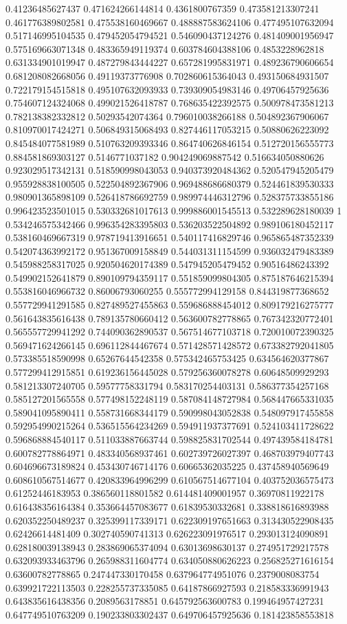 \begin{table}
\begin{tabu}
\begin{sparkline}{10}
0.41236485627437 0.471624266144814 0.4361800767359 0.473581213307241 0.461776389802581 0.475538160469667 0.488887583624106 0.477495107632094 0.517146995104535 0.479452054794521 0.546090437124276 0.481409001956947 0.575169663071348 0.483365949119374 0.603784604388106 0.4853228962818 0.631334901019947 0.487279843444227 0.657281995831971 0.489236790606654 0.681208082668056 0.49119373776908 0.702860615364043 0.493150684931507 0.722179154515818 0.495107632093933 0.739309054983146 0.49706457925636 0.754607124324068 0.499021526418787 0.768635422392575 0.500978473581213 0.782138382332812 0.50293542074364 0.796010038266188 0.504892367906067 0.810970017424271 0.506849315068493 0.827446117053215 0.50880626223092 0.845484077581989 0.510763209393346 0.864740626846154 0.512720156555773 0.884581869303127 0.5146771037182 0.904249069887542 0.516634050880626 0.923029517342131 0.518590998043053 0.940373920484362 0.520547945205479 0.955928838100505 0.522504892367906 0.969488686680379 0.524461839530333 0.980901365898109 0.526418786692759 0.989974446312796 0.528375733855186 0.996423523501015 0.530332681017613 0.999886001545513 0.532289628180039 1 0.534246575342466 0.996354283395803 0.536203522504892 0.989106180452117 0.538160469667319 0.978719413916651 0.540117416829746 0.965865487352339 0.542074363992172 0.951367009158849 0.544031311154599 0.936032479483389 0.545988258317025 0.920504620174389 0.547945205479452 0.90516486243392 0.549902152641879 0.890109794359117 0.551859099804305 0.875187646215394 0.553816046966732 0.86006793060255 0.555772994129158 0.844319877368652 0.557729941291585 0.827489527455863 0.559686888454012 0.809179216275777 0.561643835616438 0.789135780660412 0.563600782778865 0.767342320772401 0.565557729941292 0.744090362890537 0.567514677103718 0.720010072390325 0.569471624266145 0.696112844467674 0.571428571428572 0.673382792041805 0.573385518590998 0.65267644542358 0.575342465753425 0.634564620377867 0.577299412915851 0.619236156445028 0.579256360078278 0.60648509929293 0.581213307240705 0.59577758331794 0.583170254403131 0.586377354257168 0.585127201565558 0.577498152248119 0.587084148727984 0.568447665331035 0.589041095890411 0.558731668344179 0.590998043052838 0.548097917455858 0.592954990215264 0.536515564234269 0.594911937377691 0.524103411728622 0.596868884540117 0.511033887663744 0.598825831702544 0.497439584184781 0.600782778864971 0.483340568937461 0.602739726027397 0.468703979407743 0.604696673189824 0.453430746714176 0.60665362035225 0.437458940569649 0.608610567514677 0.420833964996299 0.610567514677104 0.403752036575473 0.61252446183953 0.386560118801582 0.614481409001957 0.36970811922178 0.616438356164384 0.353664457083677 0.61839530332681 0.338818616893988 0.620352250489237 0.325399117339171 0.622309197651663 0.313430522908435 0.62426614481409 0.302740590741313 0.626223091976517 0.293013124090891 0.628180039138943 0.283869065374094 0.63013698630137 0.274951729217578 0.632093933463796 0.265988311604774 0.634050880626223 0.256825271616154 0.63600782778865 0.247447330170458 0.637964774951076 0.2379008083754 0.639921722113503 0.228255737335085 0.64187866927593 0.218583336991943 0.643835616438356 0.2089563178851 0.645792563600783 0.199464957427231 0.647749510763209 0.190233803302437 0.649706457925636 0.181423858553818 
\end{sparkline}
\end{tabu}
\end{table}
